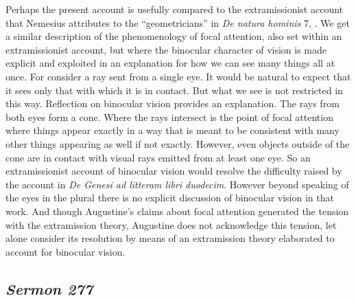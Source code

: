 \documentclass[12pt]{article}
\begin{document}
Perhaps the present account is usefully compared to the extramissionist account that Nemesius attributes to the ``geometricians'' in \emph{De natura hominis} 7, \citet[104--105]{Sharples:2008aa}.
We get a similar description of the phenomenology of focal attention, also set within an extramissionist account, but where the binocular character of vision is made explicit and exploited in an explanation for how we can see many things all at once. For consider a ray sent from a single eye. It would be natural to expect that it sees only that with which it is in contact. But what we see is not restricted in this way. Reflection on binocular vision provides an explanation. The rays from both eyes form a cone. Where the rays intersect is the point of focal attention where things appear exactly in a way that is meant to be consistent with many other things appearing as well if not exactly. However, even objects outside of the cone are in contact with visual rays emitted from at least one eye. So an extramissionist account of binocular vision would resolve the difficulty raised by the account in \emph{De Genesi ad litteram libri duodecim}. However beyond speaking of the eyes in the plural there is no explicit discussion of binocular vision in that work. And though Augustine's claims about focal attention generated the tension with the extramission theory, Augustine does not acknowledge this tension, let alone consider its resolution by means of an extramission theory elaborated to account for binocular vision.


\subsection{\emph{Sermon 277}} %
\label{sub:sermon_277}
\end{document}
